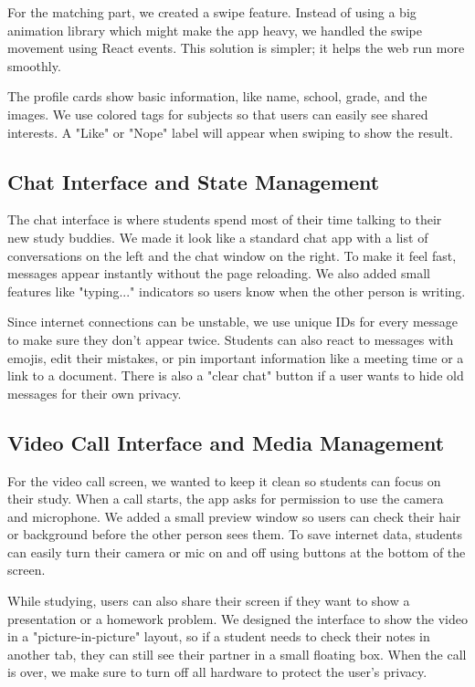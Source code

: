 \documentclass[a4paper,12pt]{report}
\begin{document}
For the matching part, we created a swipe feature. Instead of using a big animation library which might make the app heavy, we handled the swipe movement using React events. This solution is simpler; it helps the web run more smoothly. 

The profile cards show basic information, like name, school, grade, and the images. We use colored tags for subjects so that users can easily see shared interests. A "Like" or "Nope" label will appear when swiping to show the result.


\subsection{Chat Interface and State Management}

The chat interface is where students spend most of their time talking to their new study buddies. We made it look like a standard chat app with a list of conversations on the left and the chat window on the right. To make it feel fast, messages appear instantly without the page reloading. We also added small features like "typing..." indicators so users know when the other person is writing.

Since internet connections can be unstable, we use unique IDs for every message to make sure they don't appear twice. Students can also react to messages with emojis, edit their mistakes, or pin important information like a meeting time or a link to a document. There is also a "clear chat" button if a user wants to hide old messages for their own privacy.

\subsection{Video Call Interface and Media Management}

For the video call screen, we wanted to keep it clean so students can focus on their study. When a call starts, the app asks for permission to use the camera and microphone. We added a small preview window so users can check their hair or background before the other person sees them. To save internet data, students can easily turn their camera or mic on and off using buttons at the bottom of the screen.

While studying, users can also share their screen if they want to show a presentation or a homework problem. We designed the interface to show the video in a "picture-in-picture" layout, so if a student needs to check their notes in another tab, they can still see their partner in a small floating box. When the call is over, we make sure to turn off all hardware to protect the user's privacy.
\end{document}
